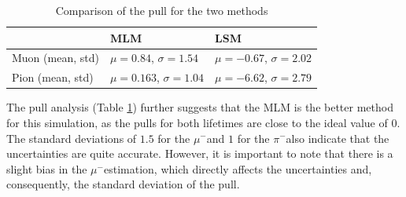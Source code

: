 \documentclass[11pt, a4paper, oneside]{book}
\newcommand{\pion}{$\pi^{-}$}
\newcommand{\muon}{$\mu^{-}$}
\begin{document}

\begin{table}[H]
\centering
  \caption{Comparison of the pull for the two methods}
  \label{tab:pull_results}
  \begin{tabular}{l|ll}
                   & MLM                                & LSM \\ \hline
  Muon (mean, std) & $\mu = 0.84$, $\sigma = 1.54 $     & $\mu = -0.67$, $\sigma = 2.02$  \\
  Pion (mean, std) & $\mu = 0.163$, $\sigma = 1.04$     & $\mu = -6.62$, $\sigma = 2.79$ 
  \end{tabular}
\end{table}

The pull analysis (Table \ref{tab:pull_results}) further suggests that the MLM is the better method for this simulation, as the pulls for both lifetimes are close to the ideal value of 0. The standard deviations of $1.5$ for the \muon and $1$ for the \pion also indicate that the uncertainties are quite accurate. However, it is important to note that there is a slight bias in the \muon estimation, which directly affects the uncertainties and, consequently, the standard deviation of the pull.

\end{document}

